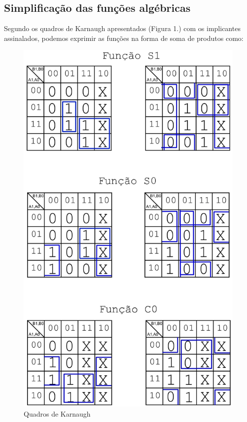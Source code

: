 \documentclass[a4paper,12pt]{article}
\begin{document}
\subsection{Simplificação das funções algébricas}

Segundo os quadros de Karnaugh apresentados (Figura 1.) com os implicantes assinalados, podemos exprimir as funções na forma de soma de produtos como:
\begin{figure}[h]
\caption{Quadros de Karnaugh}
\begin{center}
\includegraphics[scale=.27]{k3x.png}
\end{center}
\end{figure}
\end{document}
